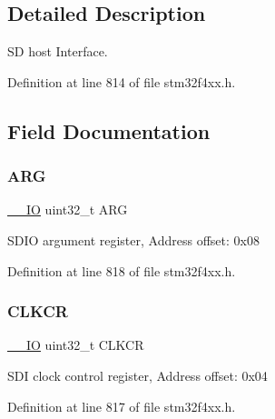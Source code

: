 \subsection{Detailed Description}
SD host Interface. 

Definition at line 814 of file stm32f4xx.\+h.



\subsection{Field Documentation}
\mbox{\label{struct_s_d_i_o___type_def_a07d4e63efcbde252c667e64a8d818aa9}} 
\subsubsection{\texorpdfstring{A\+RG}{ARG}}
{\footnotesize\ttfamily \hyperlink{group___c_m_s_i_s__core__definitions_gaec43007d9998a0a0e01faede4133d6be}{\+\_\+\+\_\+\+IO} uint32\+\_\+t A\+RG}

S\+D\+IO argument register, Address offset\+: 0x08 

Definition at line 818 of file stm32f4xx.\+h.

\mbox{\label{struct_s_d_i_o___type_def_aa94197378e20fc739d269be49d9c5d40}} 
\subsubsection{\texorpdfstring{C\+L\+K\+CR}{CLKCR}}
{\footnotesize\ttfamily \hyperlink{group___c_m_s_i_s__core__definitions_gaec43007d9998a0a0e01faede4133d6be}{\+\_\+\+\_\+\+IO} uint32\+\_\+t C\+L\+K\+CR}

S\+DI clock control register, Address offset\+: 0x04 

Definition at line 817 of file stm32f4xx.\+h.

\mbox{\label{struct_s_d_i_o___type_def_adcf812cbe5147d300507d59d4a55935d}} 
